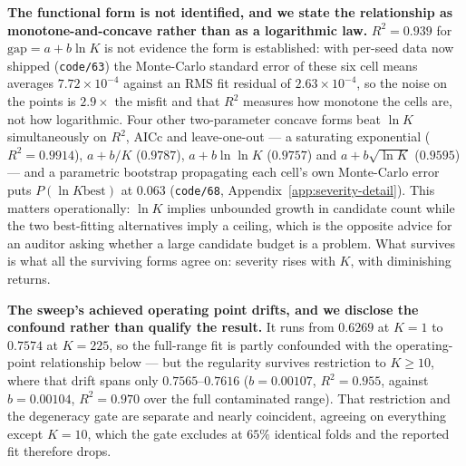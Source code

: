\documentclass[10pt]{article} %
\begin{document}
\textbf{The functional form is not identified, and we state the relationship as
monotone-and-concave rather than as a logarithmic law.} $R^2=0.939$ for
$\text{gap}=a+b\ln K$ is not evidence the form is established: with per-seed
data now shipped (\texttt{code/63}) the Monte-Carlo standard error of these six
cell means averages $7.72\times10^{-4}$ against an RMS fit residual of
$2.63\times10^{-4}$, so the noise on the points is $2.9\times$ the misfit and
that $R^2$ measures how monotone the cells are, not how logarithmic. Four other
two-parameter concave forms beat $\ln K$ simultaneously on $R^2$, AICc and
leave-one-out --- a saturating exponential ($R^2=0.9914$), $a+b/K$ ($0.9787$),
$a+b\ln\ln K$ ($0.9757$) and $a+b\sqrt{\ln K}$ ($0.9595$) --- and a parametric
bootstrap propagating each cell's own Monte-Carlo error puts $P(\ln K\text{
best})$ at $0.063$ (\texttt{code/68}, Appendix~\ref{app:severity-detail}). This matters
operationally: $\ln K$ implies unbounded growth in candidate count while the
two best-fitting alternatives imply a ceiling, which is the opposite advice for
an auditor asking whether a large candidate budget is a problem. What survives
is what all the surviving forms agree on: severity rises with $K$, with
diminishing returns.

\textbf{The sweep's achieved operating point drifts, and we disclose the
confound rather than qualify the result.} It runs from $0.6269$ at $K=1$ to
$0.7574$ at $K=225$, so the full-range fit is partly confounded with the
operating-point relationship below --- but the regularity survives restriction
to $K\geq10$, where that drift spans only $0.7565$--$0.7616$ ($b=0.00107$,
$R^2=0.955$, against $b=0.00104$, $R^2=0.970$ over the full contaminated
range). That restriction and the degeneracy gate are separate and nearly
coincident, agreeing on everything except $K=10$, which the gate excludes at
$65\%$ identical folds and the reported fit therefore drops.
\end{document}
